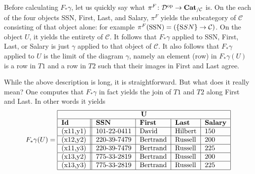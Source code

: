 \documentclass{amsart}
\newcommand{\comment}[1]{}
\def\tn{\textnormal}
\def\mc{\mathcal}
\def\to{\rightarrow}
\def\cross{\times}
\def\taking{\colon}
\def\op{^\tn{op}}
\def\Cat{{\bf Cat}}
\def\Set{{\bf Set}}
\def\mcC{\mc{C}}
\def\mcD{\mc{D}}
\theoremstyle{remark}
\theoremstyle{definition}
\begin{document}
\comment{%

What is $\pi^F\taking\mcD\op\to\Cat_{/\mcC}$ in this case?  One checks that \begin{align*}\pi^F(U)&=\mcC\\\notag\pi_F(\tn{SSN})&=\fbox{$\bullet^{\tn{SSN}}$}\\\notag\pi_F(\tn{First})&=\fbox{$\bullet^{\tn{First}}$}\\\notag\pi_F(\tn{Last})&=\fbox{$\bullet^{\tn{Last}}$}\\\notag\pi_F(\tn{Salary})&=\fbox{$\bullet^{\tn{Salary}}$}.\end{align*}  These are all straightforward, as are the induced functors over $\mcC$.  For each of the above we have a functor to $\mcC$ which we compose with $\gamma$ to get a functor to $\Set$.  We are interested in the limit of each of these functors.  They will be (in order) \begin{align*}&\gamma(T1)\cross_{(\gamma(\tn{First})\cross\gamma(\tn{Last})}\gamma(T2);\\ &\gamma(\tn{SSN});\\&\gamma(\tn{First});\\&\gamma(\tn{Last}); \\&\gamma(\tn{Salary}).\end{align*}

}%

Before calculating $F_*\gamma$, let us quickly say what $\pi^F\taking\mcD\op\to\Cat_{/\mcC}$ is.  On the each of the four objects SSN, First, Last, and Salary, $\pi^F$ yields the subcategory of $\mcC$ consisting of that object alone: for example $\pi^F(\tn{SSN})=(\{{\tn SSN}\}\to\mcC)$.  On the object $U$, it yields the entirety of $\mcC$.  It follows that $F_*\gamma$ applied to SSN, First, Last, or Salary is just $\gamma$ applied to that object of $\mcC$.  It also follows that $F_*\gamma$ applied to $U$ is the limit of the diagram $\gamma$, namely an element (row) in $F_*\gamma(U)$ is a row in $T1$ and a row in $T2$ such that their images in First and Last agree.

While the above description is long, it is straightforward.  But what does it really mean?  One computes that $F_*\gamma$ in fact yields the join of $T1$ and $T2$ along First and Last.  In other words it yields \begin{align*}F_*\gamma(U)=\begin{tabular}{| l || l | l | l | l |}\hline\multicolumn{5}{| c |}{\bf U}\\\hline{\bf Id}&{\bf SSN}&{\bf First}&{\bf Last}&{\bf Salary}\\\hline (x11,y1)&101-22-0411&David&Hilbert&150\\\hline (x12,y2)&220-39-7479&Bertrand&Russell&200\\\hline (x11,y3)&220-39-7479&Bertrand&Russell&225\\\hline (x13,y2)&775-33-2819&Bertrand&Russell&200\\\hline (x13,y3)&775-33-2819&Bertrand&Russell&225\\\hline\end{tabular}\end{align*}
\end{document}
